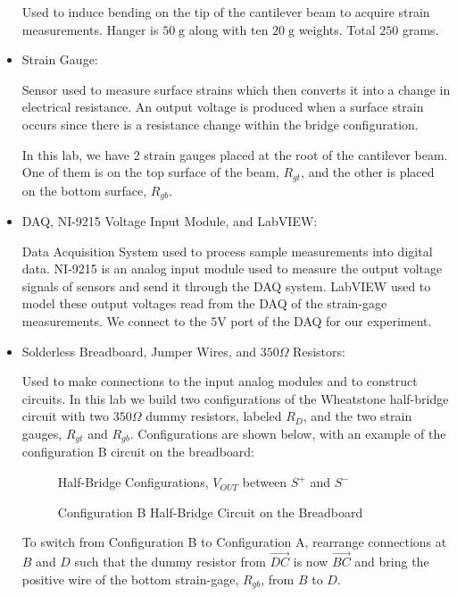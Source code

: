 \documentclass{article}
\begin{document}
\begin{itemize}
Used to induce bending on the tip of the cantilever beam to acquire strain measurements. Hanger is $50\; \text{g}$ along with ten $20\; \text{g}$ weights. Total $250$ grams. 
\vspace{2.5mm}

\item Strain Gauge: 
\vspace{1mm}

Sensor used to measure surface strains which then converts it into a change in electrical resistance. An output voltage is produced when a surface strain occurs since there is a resistance change within the bridge configuration.
\vspace{1mm}

In this lab, we have 2 strain gauges placed at the root of the cantilever beam. One of them is on the top surface of the beam, $R_{g t}$, and the other is placed on the bottom surface, $R_{g b}$.
\vspace{2.5mm}

\item DAQ, NI-9215 Voltage Input Module, and LabVIEW:
\vspace{1mm}

Data Acquisition System used to process sample measurements into digital data. NI-9215 is an analog input module used to measure the output voltage signals of sensors and send it through the DAQ system. LabVIEW used to model these output voltages read from the DAQ of the strain-gage measurements. We connect to the $5 \text{V}$ port of the DAQ for our experiment.
\vspace{2.5mm}

\item Solderless Breadboard, Jumper Wires, and $350\Omega$ Resistors: 
\vspace{1mm}

Used to make connections to the input analog modules and to construct circuits. In this lab we build two configurations of the Wheatstone half-bridge circuit with two $350\Omega$ dummy resistors, labeled $R_{D}$, and the two strain gauges, $R_{gt}$ and $R_{gb}$. Configurations are shown below, with an example of the configuration B circuit on the breadboard:

\hypertarget{fig1}{}
\begin{figure}[H]
    \centering
    \caption{Half-Bridge Configurations, $V_{OUT}$ between $S^{+}$ and $S^{-}$}
\end{figure}
\begin{figure}[H]
    \centering
    \caption{Configuration B Half-Bridge Circuit on the Breadboard}
\end{figure}

To switch from Configuration B to Configuration A, rearrange connections at $B$ and $D$ such that the dummy resistor from $\overrightarrow{DC}$ is now $\overrightarrow{BC}$ and bring the positive wire of the bottom strain-gage, $R_{gb}$, from $B$ to $D$.


\end{itemize}
\end{document}

